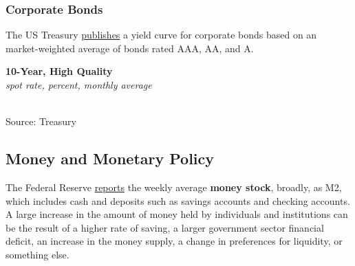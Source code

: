 \documentclass{report}
\makeatletter
\newcommand{\tbllink}[1]{\href{https://raw.githubusercontent.com/bdecon/US-chartbook/master/chartbook/data/#1}{\faTable}}
\newcommand*\short[1]{\expandafter\@gobbletwo\number\numexpr#1\relax}
\newcommand{\shdateaxisticks}{
		date coordinates in=x, axis line style={draw=none},
		xmax={2021-02-01},
		max space between ticks=40,	    
		xtick={{1990-01-01}, {1995-01-01}, {2000-01-01}, 
			{2005-01-01}, {2010-01-01}, {2015-01-01}, {2020-01-01}},
		minor xtick={},
		enlarge y limits={0.06}, enlarge x limits={0.01},
		}
\newcommand{\bbar}[2]{extra #1 ticks = {{#2}}, extra #1 tick labels = ,
		extra #1 tick style = {grid=major, grid style={thick, black!25}},}
\newcommand{\stdline}[4]{\addplot[very thick, no markers, color=#1] 
		table [x=#2, y=#3, col sep=comma] {#4};	}
\newcommand{\rbars}{
		\fill[color=black!10] (axis cs:{1990-07-01},\pgfkeysvalueof{/pgfplots/ymin}) rectangle 
			(axis cs:{1991-03-01}, \pgfkeysvalueof{/pgfplots/ymax});
		\fill[color=black!10] (axis cs:{2007-12-01},\pgfkeysvalueof{/pgfplots/ymin}) rectangle 
			(axis cs:{2009-07-01}, \pgfkeysvalueof{/pgfplots/ymax});
		\fill[color=black!10] (axis cs:{2001-03-01},\pgfkeysvalueof{/pgfplots/ymin}) rectangle 
			(axis cs:{2001-11-01}, \pgfkeysvalueof{/pgfplots/ymax});}
\makeatother
\begin{document}
{{{{{{{{{\subsubsection*{\color{black!70} \seriffont Corporate Bonds}
\begin{minipage}{0.29\textwidth}
\small The US Treasury \href{https://www.treasury.gov/resource-center/economic-policy/corp-bond-yield/Pages/Corp-Yield-Bond-Curve-Papers.aspx}{publishes} a yield curve for corporate bonds based on an market-weighted average of bonds rated AAA, AA, and A.  \\
\end{minipage}\hspace{8mm} \begin{minipage}{0.41\textwidth}
\noindent \normalsize \textbf{10-Year, High Quality}\\
\footnotesize{\textit{spot rate, percent, monthly average}}\\ 
\noindent \hspace*{-2mm} \\
\footnotesize{Source: Treasury} \hfill \tbllink{hqcb.csv}\\
\end{minipage}



\newpage

\begin{minipage}{0.76\textwidth}

\subsection*{\color{black!70} \seriffont Money and Monetary Policy}

\small The Federal Reserve \href{https://www.federalreserve.gov/releases/h6/current/default.htm}{reports} the weekly average \textbf{money stock}, broadly, as M2, which includes cash and deposits such as savings accounts and checking accounts. \\

A large increase in the amount of money held by individuals and institutions can be the result of a higher rate of saving, a larger government sector financial deficit, an increase in the money supply, a change in preferences for liquidity, or something else. \\


\end{minipage}}}}}}}}}}
\end{document}
